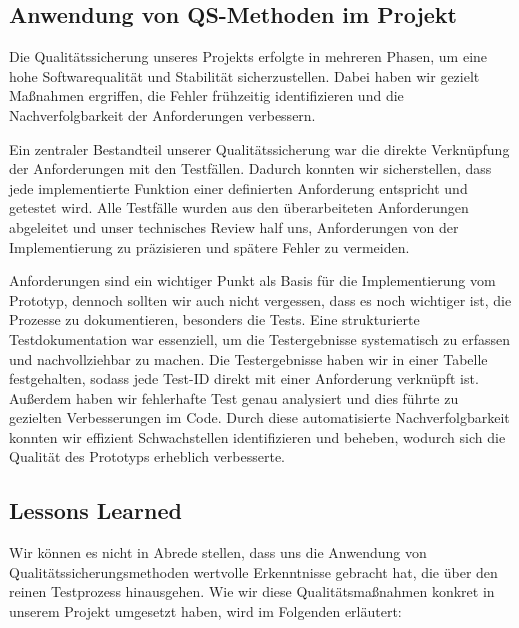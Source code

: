 \subsection{Anwendung von QS-Methoden im Projekt}\label{subsec: anwendung-von-qs-methoden-im-projekt}

Die Qualitätssicherung unseres Projekts erfolgte in mehreren Phasen, um eine hohe Softwarequalität und Stabilität sicherzustellen. 
Dabei haben wir gezielt Maßnahmen ergriffen, die Fehler frühzeitig identifizieren und die Nachverfolgbarkeit der Anforderungen verbessern.

Ein zentraler Bestandteil unserer Qualitätssicherung war die direkte Verknüpfung der Anforderungen mit den Testfällen.
Dadurch konnten wir sicherstellen, dass jede implementierte Funktion einer definierten Anforderung entspricht und getestet wird.
Alle Testfälle wurden aus den überarbeiteten Anforderungen abgeleitet und unser technisches Review half uns, Anforderungen von der Implementierung zu präzisieren und spätere Fehler zu vermeiden.

Anforderungen sind ein wichtiger Punkt als Basis für die Implementierung vom Prototyp, dennoch sollten wir auch nicht vergessen, dass es noch wichtiger ist, die Prozesse zu dokumentieren, besonders die Tests. 
Eine strukturierte Testdokumentation war essenziell, um die Testergebnisse systematisch zu erfassen und nachvollziehbar zu machen.
Die Testergebnisse haben wir in einer Tabelle festgehalten, sodass jede Test-ID direkt mit einer Anforderung verknüpft ist.
Außerdem haben wir fehlerhafte Test genau analysiert und dies führte zu gezielten Verbesserungen im Code.
Durch diese automatisierte Nachverfolgbarkeit konnten wir effizient Schwachstellen identifizieren und beheben, wodurch sich die Qualität des Prototyps erheblich verbesserte.

\subsection{Lessons Learned}\label{subsec:lessons-learned}

Wir können es nicht in Abrede stellen, dass uns die Anwendung von Qualitätssicherungsmethoden wertvolle Erkenntnisse gebracht hat, die über den reinen Testprozess hinausgehen.
Wie wir diese Qualitätsmaßnahmen konkret in unserem Projekt umgesetzt haben, wird im Folgenden erläutert:

